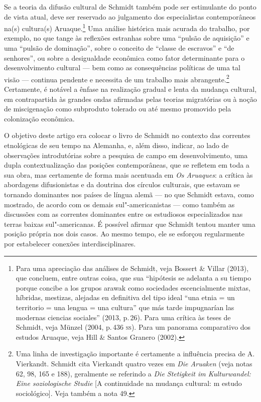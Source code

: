 Se a teoria da difusão cultural de Schmidt também pode ser estimulante
do ponto de vista atual, deve ser reservado ao julgamento dos
especialistas contemporâneos na(s) cultura(s) Aruaque.\footnote{Para uma
  apreciação das análises de Schmidt, veja Bossert \& Villar (2013), que
  concluem, entre outras coisa, que sua ``hipótesis se adelanta a su
  tiempo porque concibe a los grupos arawak como sociedades
  escencialmente mixtas, híbridas, mestizas, alejadas en definitiva del
  tipo ideal ``una etnia = un territorio = una lengua = una cultura'' que
  más tarde impugnarían las modernas ciencias sociales'' (2013, p.\,26).
  Para uma crítica às teses de Schmidt, veja Münzel (2004, p.\,436 \textsc{ss}).
  Para um panorama comparativo dos estudos Aruaque, veja Hill \& Santos
  Granero (2002).} Uma análise histórica mais acurada do trabalho, por
exemplo, no que tange às reflexões estranhas sobre uma ``pulsão de
aquisição'' e uma ``pulsão de dominação'', sobre o conceito de ``classe
de escravos'' e ``de senhores'', ou sobre a desigualdade econômica como
fator determinante para o desenvolvimento cultural --- bem como as
consequências políticas de uma tal visão --- continua pendente e
necessita de um trabalho mais abrangente.\footnote{Uma linha de
  investigação importante é certamente a influência precisa de A.
  Vierkandt. Schmidt cita Vierkandt quatro vezes em \textit{Die Aruaken}
  (veja notas 62, 98, 165 e 188), geralmente se referindo a \textit{Die
  Stetigkeit im Kulturwandel: Eine soziologische Studie} {[}A
  continuidade na mudança cultural: m estudo sociológico{]}. Veja
  também a nota 49.} Certamente, é notável a ênfase na realização
gradual e lenta da mudança cultural, em contrapartida às grandes ondas
afirmadas pelas teorias migratórias ou à noção de miscigenação como
subproduto tolerado ou até mesmo promovido pela colonização econômica.

O objetivo deste artigo era colocar o livro de Schmidt no contexto das
correntes etnológicas de seu tempo na Alemanha, e, além disso, indicar,
ao lado de observações introdutórias sobre a pesquisa de campo em
desenvolvimento, uma dupla contextualização das posições contemporâneas,
que se refletem em toda a sua obra, mas certamente de forma mais
acentuada em \textit{Os Aruaques}: a crítica às abordagens difusionistas e
da doutrina dos círculos culturais, que estavam se tornando dominantes
nos países de língua alemã --- no que Schmidt estava, como mostrado, de
acordo com os demais sul"-americanistas --- como também as discussões com
as correntes dominantes entre os estudiosos especializados nas terras
baixas sul"-americanas. É possível afirmar que Schmidt tentou manter uma
posição própria nos dois casos. Ao mesmo tempo, ele se esforçou
regularmente por estabelecer conexões interdisciplinares.

